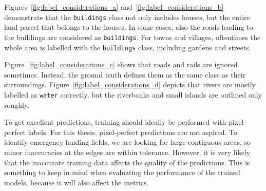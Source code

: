 Figures~\ref{fig:label_considerations_a} and~\ref{fig:label_considerations_b} demonstrate that the \texttt{buildings} class not only includes houses, but the entire land parcel that belongs to the houses. In some cases, also the roads leading to the buildings are considered as \texttt{buildings}. For towns and villages, oftentimes the whole area is labelled with the \texttt{buildings} class, including gardens and streets.

Figure~\ref{fig:label_considerations_c} shows that roads and rails are ignored sometimes. Instead, the ground truth defines them as the same class as their surroundings. Figure~\ref{fig:label_considerations_d} depicts that rivers are mostly labelled as \texttt{water} correctly, but the riverbanks and small islands are outlined only roughly.

To get excellent predictions, training should ideally be performed with pixel-perfect labels. For this thesis, pixel-perfect predictions are not aspired. To identify emergency landing fields, we are looking for large contiguous areas, so minor inaccuracies at the edges are within tolerance. However, it is very likely that the inaccurate training data affects the quality of the predictions. This is something to keep in mind when evaluating the performance of the trained models, because it will also affect the metrics.

\clearpage
